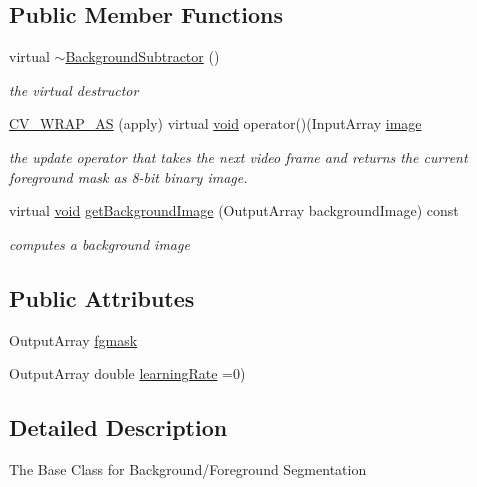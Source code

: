 \subsection*{Public Member Functions}
\begin{DoxyCompactItemize}
\item 
virtual \hyperlink{classcv_1_1BackgroundSubtractor_ada02552c48d2e535741711c14396efdc}{$\sim$\-Background\-Subtractor} ()
\begin{DoxyCompactList}\small\item\em the virtual destructor \end{DoxyCompactList}\item 
\hyperlink{classcv_1_1BackgroundSubtractor_ab880cbcaa3cbacf1a7e65193b18df76b}{C\-V\-\_\-\-W\-R\-A\-P\-\_\-\-A\-S} (apply) virtual \hyperlink{legacy_8hpp_a8bb47f092d473522721002c86c13b94e}{void} operator()(Input\-Array \hyperlink{legacy_8hpp_ad62b16ab219ae2483e8a3d921c44cc97}{image}
\begin{DoxyCompactList}\small\item\em the update operator that takes the next video frame and returns the current foreground mask as 8-\/bit binary image. \end{DoxyCompactList}\item 
virtual \hyperlink{legacy_8hpp_a8bb47f092d473522721002c86c13b94e}{void} \hyperlink{classcv_1_1BackgroundSubtractor_ad6bbeb733a9cb258a7c9a69442fd0bda}{get\-Background\-Image} (Output\-Array background\-Image) const 
\begin{DoxyCompactList}\small\item\em computes a background image \end{DoxyCompactList}\end{DoxyCompactItemize}
\subsection*{Public Attributes}
\begin{DoxyCompactItemize}
\item 
Output\-Array \hyperlink{classcv_1_1BackgroundSubtractor_a3a04333e20f88e6799f368d7abb2abd9}{fgmask}
\item 
Output\-Array double \hyperlink{classcv_1_1BackgroundSubtractor_a98797ef02141e31b050f1ed6259fd229}{learning\-Rate} =0)
\end{DoxyCompactItemize}


\subsection{Detailed Description}
The Base Class for Background/\-Foreground Segmentation

